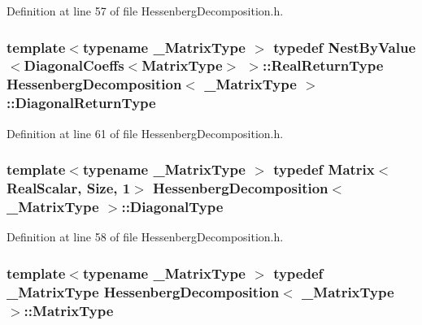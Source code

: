 Definition at line 57 of file Hessenberg\-Decomposition.\-h.

\hypertarget{class_hessenberg_decomposition_a106d23099756c3db13dfdecac91b9250}{
\subsubsection[{Diagonal\-Return\-Type}]{\setlength{\rightskip}{0pt plus 5cm}template$<$typename \-\_\-\-Matrix\-Type $>$ typedef {\bf Nest\-By\-Value}$<${\bf Diagonal\-Coeffs}$<${\bf Matrix\-Type}$>$ $>$\-::Real\-Return\-Type {\bf Hessenberg\-Decomposition}$<$ \-\_\-\-Matrix\-Type $>$\-::{\bf Diagonal\-Return\-Type}}}\label{class_hessenberg_decomposition_a106d23099756c3db13dfdecac91b9250}


Definition at line 61 of file Hessenberg\-Decomposition.\-h.

\hypertarget{class_hessenberg_decomposition_adf12c2ec893935345228cc508c8bb4b3}{
\subsubsection[{Diagonal\-Type}]{\setlength{\rightskip}{0pt plus 5cm}template$<$typename \-\_\-\-Matrix\-Type $>$ typedef {\bf Matrix}$<${\bf Real\-Scalar}, {\bf Size}, 1$>$ {\bf Hessenberg\-Decomposition}$<$ \-\_\-\-Matrix\-Type $>$\-::{\bf Diagonal\-Type}}}\label{class_hessenberg_decomposition_adf12c2ec893935345228cc508c8bb4b3}


Definition at line 58 of file Hessenberg\-Decomposition.\-h.

\hypertarget{class_hessenberg_decomposition_a9ecabc0c14a42b62ef12497bd48a0d44}{
\subsubsection[{Matrix\-Type}]{\setlength{\rightskip}{0pt plus 5cm}template$<$typename \-\_\-\-Matrix\-Type $>$ typedef \-\_\-\-Matrix\-Type {\bf Hessenberg\-Decomposition}$<$ \-\_\-\-Matrix\-Type $>$\-::{\bf Matrix\-Type}}}\label{class_hessenberg_decomposition_a9ecabc0c14a42b62ef12497bd48a0d44}


